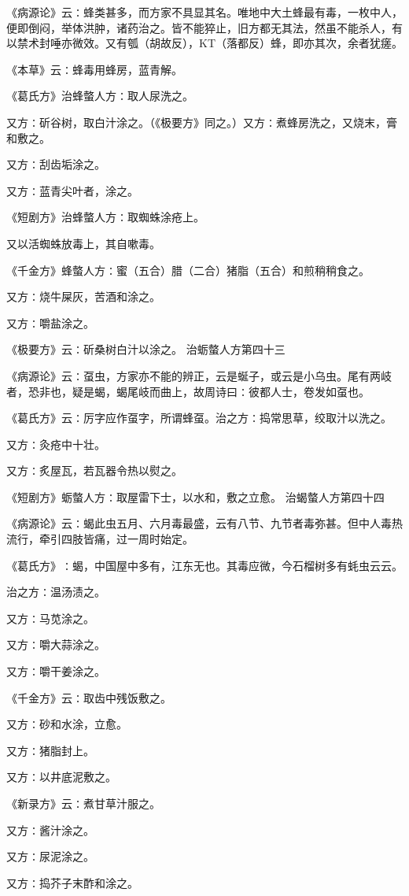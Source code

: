 \documentclass[a4paper,12pt,UTF8,twoside]{ctexbook}
\begin{document}
《病源论》云∶蜂类甚多，而方家不具显其名。唯地中大土蜂最有毒，一枚中人，便即倒闷，举体洪肿，诸药治之。皆不能猝止，旧方都无其法，然虽不能杀人，有以禁术封唾亦微效。又有瓠（胡故反），KT（落都反）蜂，即亦其次，余者犹瘥。

《本草》云∶蜂毒用蜂房，蓝青解。

《葛氏方》治蜂螫人方∶取人尿洗之。

又方∶斫谷树，取白汁涂之。（《极要方》同之。）又方∶煮蜂房洗之，又烧末，膏和敷之。

又方∶刮齿垢涂之。

又方∶蓝青尖叶者，涂之。

《短剧方》治蜂螫人方∶取蜘蛛涂疮上。

又以活蜘蛛放毒上，其自嗽毒。

《千金方》蜂螫人方∶蜜（五合）腊（二合）猪脂（五合）和煎稍稍食之。

又方∶烧牛屎灰，苦酒和涂之。

又方∶嚼盐涂之。

《极要方》云∶斫桑树白汁以涂之。
治蛎螫人方第四十三

《病源论》云∶虿虫，方家亦不能的辨正，云是蜒子，或云是小乌虫。尾有两岐者，恐非也，疑是蝎，蝎尾岐而曲上，故周诗曰∶彼都人士，卷发如虿也。

《葛氏方》云∶厉字应作虿字，所谓蜂虿。治之方∶捣常思草，绞取汁以洗之。

又方∶灸疮中十壮。

又方∶炙屋瓦，若瓦器令热以熨之。

《短剧方》蛎螫人方∶取屋雷下士，以水和，敷之立愈。
治蝎螫人方第四十四

《病源论》云∶蝎此虫五月、六月毒最盛，云有八节、九节者毒弥甚。但中人毒热流行，牵引四肢皆痛，过一周时始定。

《葛氏方》∶蝎，中国屋中多有，江东无也。其毒应微，今石榴树多有蚝虫云云。

治之方∶温汤渍之。

又方∶马苋涂之。

又方∶嚼大蒜涂之。

又方∶嚼干姜涂之。

《千金方》云∶取齿中残饭敷之。

又方∶砂和水涂，立愈。

又方∶猪脂封上。

又方∶以井底泥敷之。

《新录方》云∶煮甘草汁服之。

又方∶酱汁涂之。

又方∶尿泥涂之。

又方∶捣芥子末酢和涂之。
\end{document}
